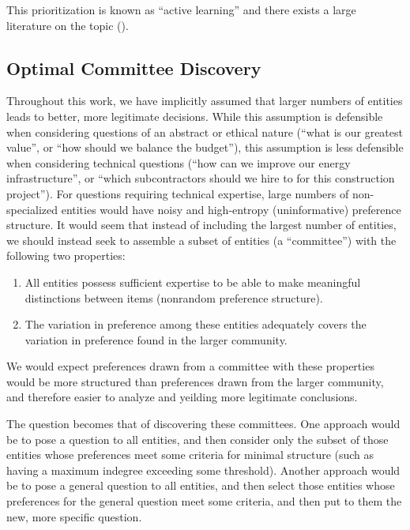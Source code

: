This prioritization is known as ``active learning'' and there exists a large literature on the topic (\cite{shahriari:2016}).

\subsection{Optimal Committee Discovery}

Throughout this work, we have implicitly assumed that larger numbers of entities leads to better, more legitimate decisions.
While this assumption is defensible when considering questions of an abstract or ethical nature (``what is our greatest value'', or ``how should we balance the budget''), this assumption is less defensible when considering technical questions (``how can we improve our energy infrastructure'', or ``which subcontractors should we hire to for this construction project'').
For questions requiring technical expertise, large numbers of non-specialized entities would have noisy and high-entropy (uninformative) preference structure.
It would seem that instead of including the largest number of entities, we should instead seek to assemble a subset of entities (a ``committee'') with the following two properties:

\begin{enumerate}
	\item All entities possess sufficient expertise to be able to make meaningful distinctions between items (nonrandom preference structure).
	\item The variation in preference among these entities adequately covers the variation in preference found in the larger community.
\end{enumerate} 

We would expect preferences drawn from a committee with these properties would be more structured than preferences drawn from the larger community, and therefore easier to analyze and yeilding more legitimate conclusions.

\bigskip

The question becomes that of discovering these committees.
One approach would be to pose a question to  all entities, and then consider only the subset of those entities whose preferences meet some criteria for minimal structure (such as having a maximum indegree exceeding some threshold).
Another approach would be to pose a general question to all entities, and then select those entities whose preferences for the general question meet some criteria, and then put to them the new, more specific question.

